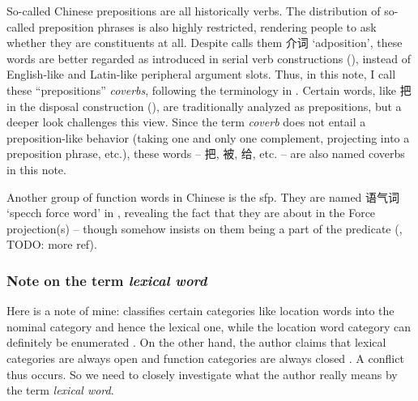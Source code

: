 \documentclass[UTF8, a4paper, oneside, scheme=plain]{ctexart}
\newcommand*{\citesec}[1]{\S~{#1}}
\newcommand*{\term}[1]{\emph{#1}}
\newcommand{\translate}[1]{`#1'}
\begin{document}
So-called Chinese prepositions are all historically verbs.
The distribution of so-called preposition phrases %
is also highly restricted,
rendering people to ask whether they are constituents at all.
Despite \citet{zhudexigrammar} calls them 介词 \translate{adposition},
these words are better regarded as introduced in serial verb constructions
(),
instead of English-like and Latin-like peripheral argument slots.
Thus, in this note, I call these ``prepositions'' \term{coverbs},
following the terminology in \citet{po2015chinese}.
Certain words, like 把 in the disposal construction (), 
are traditionally analyzed as prepositions,
but a deeper look challenges this view.
Since the term \term{coverb} does not entail 
a preposition-like behavior (taking one and only one complement, projecting into a preposition phrase, etc.),
these words -- 把, 被, 给, etc. -- 
are also named coverbs in this note.

Another group of function words in Chinese is the \ac{sfp}.
They are named 语气词 \translate{specch force word} in \citet{zhudexigrammar},
revealing the fact that they are about in the Force projection(s)
-- though \citet{zhudexigrammar} somehow insists on them being a part of the predicate
(, TODO: more ref).

\subsubsection{Note on the term \term{lexical word}}

Here is a note of mine: 
\citep[\citesec{3.6}]{zhudexigrammar} classifies 
certain categories like location words %
into the nominal category and hence the lexical one,
while the location word category can definitely be enumerated \citep[\citesec{4.4}]{zhudexigrammar}.
On the other hand, 
the author claims that lexical categories are always open 
and function categories are always closed \citet[\citesec{3.4}]{zhudexigrammar}.
A conflict thus occurs.
So we need to closely investigate what the author really means by the term \term{lexical word}.
\end{document}
